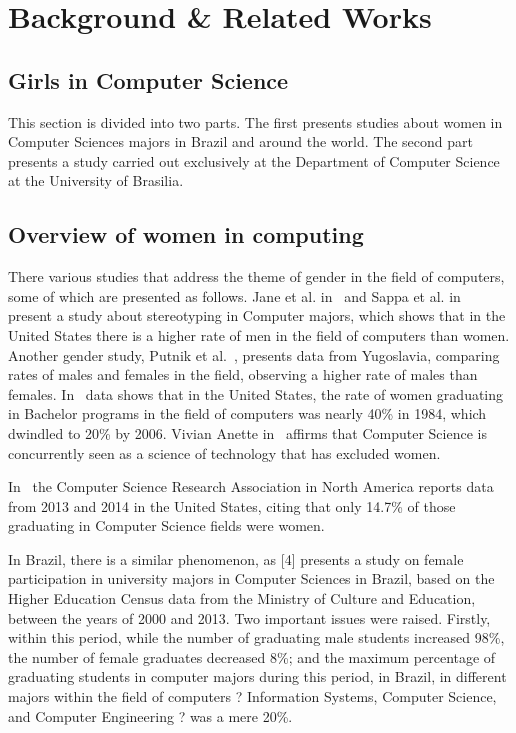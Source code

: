 \section{Background \& Related Works}\label{sec:background}%

\subsection{Girls in Computer Science}\label{subsec:background:girls}%
This section is divided into two parts. The first presents studies about women in Computer Sciences majors in Brazil and around the world. The second part presents a study carried out exclusively at the Department of Computer Science at the University of Brasilia.

\subsection{Overview of women in computing}%
There various studies that address the theme of gender in the field of computers, some of which are presented as follows.
Jane et al. in~\cite{jane_2016} and Sappa et al. in~\cite{sappa_2013} present a study about stereotyping in Computer majors, which shows that in the United States there is a higher rate of men in the field of computers than women. Another gender study, Putnik et al.~\cite{zoran_2017}, presents data from Yugoslavia, comparing rates of males and females in the field, observing a higher rate of males than females. In~\cite{keinan_2017,moshe_2015} data shows that in the United States, the rate of women graduating in Bachelor programs in the field of computers was nearly 40\% in 1984, which dwindled to 20\% by 2006. Vivian Anette in~\cite{vivian_2007} affirms that Computer Science is concurrently seen as a science of technology that has excluded women.

In~\cite{moshe_2015}  the Computer Science Research Association in North America reports data from 2013 and 2014 in the United States, citing that only 14.7\% of those graduating in Computer Science fields were women.

In Brazil, there is a similar phenomenon, as [4] presents a study on female participation in university majors in Computer Sciences in Brazil, based on the Higher Education Census data from the Ministry of Culture and Education, between the years of 2000 and 2013. Two important issues were raised. Firstly, within this period, while the number of graduating male students increased 98\%, the number of female graduates decreased 8\%; and the maximum percentage of graduating students in computer majors during this period, in Brazil, in different majors within the field of computers ? Information Systems, Computer Science, and Computer Engineering ? was a mere 20\%.



